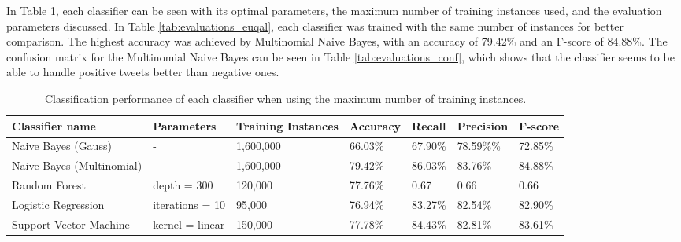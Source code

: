 In Table \ref{tab:evaluations_max}, each classifier can be seen with its optimal parameters, the maximum number of training instances used, and the evaluation parameters discussed. In Table \ref{tab:evaluations_euqal}, each classifier was trained with the same number of instances for better comparison. The highest accuracy was achieved by Multinomial Naive Bayes, with an accuracy of 79.42\% and an F-score of 84.88\%. The confusion matrix for the Multinomial Naive Bayes can be seen in Table \ref{tab:evaluations_conf}, which shows that the classifier seems to be able to handle positive tweets better than negative ones.
\begin{table}
\centering
\caption{Classification performance of each classifier when using the maximum number of training instances.}
\begin{tabular}{ |p{3cm}||p{3cm}|p{2cm}|p{1.5cm}|p{1.5cm}|p{1.5cm}|p{1.5cm}| }
 \hline
 Classifier name &          Parameters &Training Instances &    Accuracy &      Recall &     Precision& F-score \\
 \hline
 Naive Bayes (Gauss)        &-&            1,600,000&   66.03\%&        67.90\%&       78.59\%\%& 72.85\%\\
  \hline
 Naive Bayes (Multinomial)  &-&             1,600,000&      79.42\%&        86.03\%&       83.76\%& 84.88\%\\
  \hline
 Random Forest              &depth = 300&            120,000&                 77.76\%&        0.67&       0.66& 0.66\\
  \hline
 Logistic Regression        &iterations = 10&   95,000&    76.94\%&        83.27\%&   82.54\%& 82.90\%\\
  \hline
 Support Vector Machine     &kernel = linear&            150,000&   77.78\%&        84.43\%&    82.81\%& 83.61\%\\
 \hline
\end{tabular}
\label{tab:evaluations_max}
\end{table}


